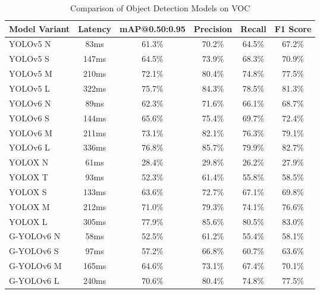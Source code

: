\begin{table}[htbp]
    \centering
    \caption{Comparison of Object Detection Models on VOC}
    \label{tab:voc_model_comparison}
    \begin{tabularx}{\textwidth}{@{}Xccccc@{}}
    \toprule
    Model Variant & Latency & mAP@0.50:0.95 & Precision & Recall & F1 Score \\ 
    \midrule
    \cite{ultralytics2021yolov5}YOLOv5 N & 83ms & 61.3\% & 70.2\% & 64.5\% & 67.2\% \\
    \cite{ultralytics2021yolov5}YOLOv5 S & 147ms & 64.5\% & 73.9\% & 68.3\% & 70.9\% \\
    \cite{ultralytics2021yolov5}YOLOv5 M & 210ms & 72.1\% & 80.4\% & 74.8\% & 77.5\% \\
    \cite{ultralytics2021yolov5}YOLOv5 L & 322ms & 75.7\% & 84.3\% & 78.5\% & 81.3\% \\
    \addlinespace
    \cite{li2023yolov6}YOLOv6 N & 89ms & 62.3\% & 71.6\% & 66.1\% & 68.7\% \\
    \cite{li2023yolov6}YOLOv6 S & 144ms & 65.6\% & 75.4\% & 69.7\% & 72.4\% \\
    \cite{li2023yolov6}YOLOv6 M & 211ms & 73.1\% & 82.1\% & 76.3\% & 79.1\% \\
    \cite{li2023yolov6}YOLOv6 L & 336ms & 76.8\% & 85.7\% & 79.9\% & 82.7\% \\
    \addlinespace
    \cite{ge2021yolox}YOLOX N & 61ms & 28.4\% & 29.8\% & 26.2\% & 27.9\% \\
    \cite{ge2021yolox}YOLOX T & 93ms & 52.3\% & 61.4\% & 55.8\% & 58.5\% \\
    \cite{ge2021yolox}YOLOX S & 133ms & 63.6\% & 72.7\% & 67.1\% & 69.8\% \\
    \cite{ge2021yolox}YOLOX M & 212ms & 71.0\% & 79.3\% & 74.1\% & 76.6\% \\
    \cite{ge2021yolox}YOLOX L & 305ms & 77.9\% & 85.6\% & 80.5\% & 83.0\% \\
    \addlinespace
    G-YOLOv6 N & 58ms & 52.5\% & 61.2\% & 55.4\% & 58.1\% \\
    G-YOLOv6 S & 97ms & 57.2\% & 66.8\% & 60.7\% & 63.6\% \\
    G-YOLOv6 M & 165ms & 64.6\% & 73.1\% & 67.4\% & 70.1\% \\
    G-YOLOv6 L & 240ms & 70.6\% & 80.4\% & 74.8\% & 77.5\% \\
    \bottomrule
    \end{tabularx}
\end{table}


